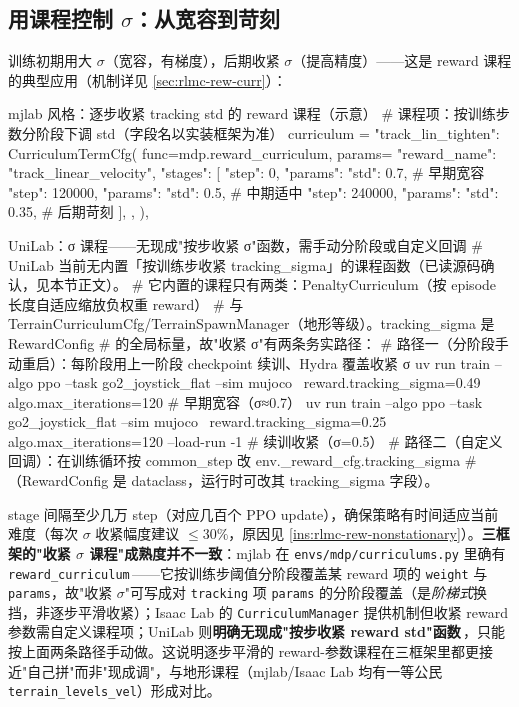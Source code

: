 \subsection{\texorpdfstring{用课程控制 $\sigma$：从宽容到苛刻}{用课程控制 sigma：从宽容到苛刻}}
\label{sec:rlmc-rew-sigmacurr}

训练初期用大 $\sigma$（宽容，有梯度），后期收紧 $\sigma$（提高精度）——这是 reward 课程的典型应用（机制详见 \cref{sec:rlmc-rew-curr}）：

\begin{codebox}[Python]{mjlab 风格：逐步收紧 tracking std 的 reward 课程（示意）}
# 课程项：按训练步数分阶段下调 std（字段名以实装框架为准）
curriculum = {
    "track_lin_tighten": CurriculumTermCfg(
        func=mdp.reward_curriculum,
        params={
            "reward_name": "track_linear_velocity",
            "stages": [
                {"step": 0,      "params": {"std": 0.7}},   # 早期宽容
                {"step": 120000, "params": {"std": 0.5}},   # 中期适中
                {"step": 240000, "params": {"std": 0.35}},  # 后期苛刻
            ],
        },
    ),
}
\end{codebox}

\begin{codebox}[Python]{UniLab：σ 课程——无现成"按步收紧 σ"函数，需手动分阶段或自定义回调}
# UniLab 当前无内置「按训练步收紧 tracking_sigma」的课程函数（已读源码确认，见本节正文）。
# 它内置的课程只有两类：PenaltyCurriculum（按 episode 长度自适应缩放负权重 reward）
#   与 TerrainCurriculumCfg/TerrainSpawnManager（地形等级）。tracking_sigma 是 RewardConfig
#   的全局标量，故"收紧 σ"有两条务实路径：
# 路径一（分阶段手动重启）：每阶段用上一阶段 checkpoint 续训、Hydra 覆盖收紧 σ
uv run train --algo ppo --task go2_joystick_flat --sim mujoco \
    reward.tracking_sigma=0.49 algo.max_iterations=120   # 早期宽容（σ≈0.7）
uv run train --algo ppo --task go2_joystick_flat --sim mujoco \
    reward.tracking_sigma=0.25 algo.max_iterations=120 --load-run -1   # 续训收紧（σ=0.5）
# 路径二（自定义回调）：在训练循环按 common_step 改 env._reward_cfg.tracking_sigma
#   （RewardConfig 是 dataclass，运行时可改其 tracking_sigma 字段）。
\end{codebox}

stage 间隔至少几万 step（对应几百个 PPO update），确保策略有时间适应当前难度（每次 $\sigma$ 收紧幅度建议 $\le30\%$，原因见 \cref{ins:rlmc-rew-nonstationary}）。\textbf{三框架的"收紧 $\sigma$ 课程"成熟度并不一致}：mjlab 在 \verb|envs/mdp/curriculums.py| 里确有 \verb|reward_curriculum|\,\cite{mjlab2026}——它按训练步阈值分阶段覆盖某 reward 项的 \verb|weight| 与 \verb|params|，故"收紧 $\sigma$"可写成对 \verb|tracking| 项 \verb|params| 的分阶段覆盖（是\emph{阶梯式}换挡，非逐步平滑收紧）；Isaac Lab 的 \verb|CurriculumManager| 提供机制但收紧 reward 参数需自定义课程项；UniLab 则\textbf{明确无现成"按步收紧 reward std"函数}\,\cite{unilab2026}，只能按上面两条路径手动做。这说明逐步平滑的 reward-参数课程在三框架里都更接近"自己拼"而非"现成调"，与地形课程（mjlab/Isaac Lab 均有一等公民 \verb|terrain_levels_vel|）形成对比。

